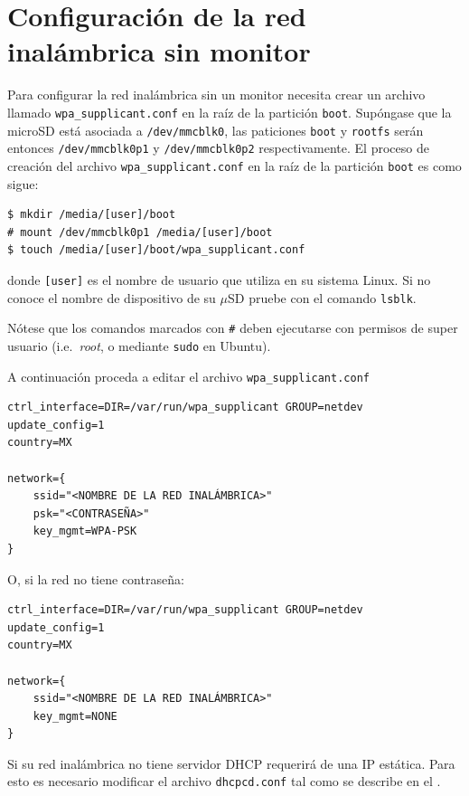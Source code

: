 \documentclass[letterpaper,10.5pt]{article}
\begin{document}
\section{Configuración de la red inalámbrica sin monitor}%
\label{sec:setup-wifi}
Para configurar la red inalámbrica sin un monitor necesita crear un archivo  llamado \texttt{wpa\_supplicant.conf} en la raíz de la partición \texttt{boot}.
Supóngase que la microSD está asociada a \texttt{/dev/mmcblk0}, las paticiones \texttt{boot} y \texttt{rootfs} serán entonces \texttt{/dev/mmcblk0p1} y \texttt{/dev/mmcblk0p2} respectivamente.
El proceso de creación del archivo \texttt{wpa\_supplicant.conf} en la raíz de la partición \texttt{boot} es como sigue:

\begin{Verbatim}[fontsize=\footnotesize]
$ mkdir /media/[user]/boot
# mount /dev/mmcblk0p1 /media/[user]/boot
$ touch /media/[user]/boot/wpa_supplicant.conf
\end{Verbatim}

\noindent donde \texttt{[user]} es el nombre de usuario que utiliza en su sistema Linux.
Si no conoce el nombre de dispositivo de su $\mu$SD pruebe con el comando \texttt{lsblk}.

Nótese que los comandos marcados con \texttt{\#} deben ejecutarse con permisos de super usuario (i.e.~\emph{root}, o mediante \texttt{sudo} en Ubuntu).

A continuación proceda a editar el archivo \texttt{wpa\_supplicant.conf}

\begin{Verbatim}[fontsize=\footnotesize]
ctrl_interface=DIR=/var/run/wpa_supplicant GROUP=netdev
update_config=1
country=MX

network={
    ssid="<NOMBRE DE LA RED INALÁMBRICA>"
    psk="<CONTRASEÑA>"
    key_mgmt=WPA-PSK
}
\end{Verbatim}

O, si la red no tiene contraseña:

\begin{Verbatim}[fontsize=\footnotesize]
ctrl_interface=DIR=/var/run/wpa_supplicant GROUP=netdev
update_config=1
country=MX

network={
    ssid="<NOMBRE DE LA RED INALÁMBRICA>"
    key_mgmt=NONE
}
\end{Verbatim}

Si su red inalámbrica no tiene servidor DHCP requerirá de una IP estática.
Para esto es necesario modificar el archivo \texttt{dhcpcd.conf} tal como se describe en el .
\end{document}
